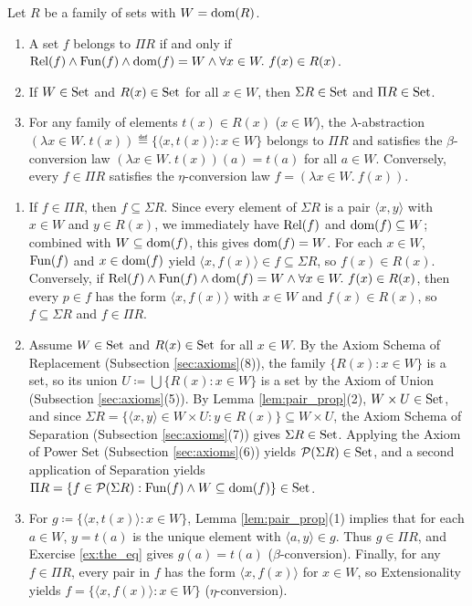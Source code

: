 \documentclass[10pt,a4paper]{article}
\begin{document}
\begin{lemma}\label{lem:sigma_pi}
Let $R$ be a family of sets with $W = {\textrm{dom}}(R)$.
\begin{enumerate}
\item A set $f$ belongs to $\Pi R$ if and only if ${\textrm{Rel}}(f) \land {\textrm{Fun}}(f) \land {\textrm{dom}}(f) = W \land \forall x \in W.\ f(x) \in R(x)$.
\item If $W \in {\textrm{Set}}$ and $R(x) \in {\textrm{Set}}$ for all $x \in W$, then $\Sigma R \in {\textrm{Set}}$ and $\Pi R \in {\textrm{Set}}$.
\item For any family of elements $t(x) \in R(x)$ ($x \in W$), the $\lambda$-abstraction $(\lambda x \in W.\ t(x)) \eqdef \{\langle x, t(x) \rangle : x \in W\}$ belongs to $\Pi R$ and satisfies the $\beta$-conversion law $(\lambda x \in W.\ t(x))(a) = t(a)$ for all $a \in W$. Conversely, every $f \in \Pi R$ satisfies the $\eta$-conversion law $f = (\lambda x \in W.\ f(x))$.
\end{enumerate}
\end{lemma}
\myprf
\begin{enumerate}
\item If $f \in \Pi R$, then $f \subseteq \Sigma R$. Since every element of $\Sigma R$ is a pair $\langle x, y \rangle$ with $x \in W$ and $y \in R(x)$, we immediately have ${\textrm{Rel}}(f)$ and ${\textrm{dom}}(f) \subseteq W$; combined with $W \subseteq {\textrm{dom}}(f)$, this gives ${\textrm{dom}}(f) = W$. For each $x \in W$, ${\textrm{Fun}}(f)$ and $x \in {\textrm{dom}}(f)$ yield $\langle x, f(x) \rangle \in f \subseteq \Sigma R$, so $f(x) \in R(x)$. Conversely, if ${\textrm{Rel}}(f) \land {\textrm{Fun}}(f) \land {\textrm{dom}}(f) = W \land \forall x \in W.\ f(x) \in R(x)$, then every $p \in f$ has the form $\langle x, f(x) \rangle$ with $x \in W$ and $f(x) \in R(x)$, so $f \subseteq \Sigma R$ and $f \in \Pi R$.
\item Assume $W \in {\textrm{Set}}$ and $R(x) \in {\textrm{Set}}$ for all $x \in W$. By the Axiom Schema of Replacement (Subsection \ref{sec:axioms}(8)), the family $\{R(x) : x \in W\}$ is a set, so its union $U \coloneqq \bigcup \{R(x) : x \in W\}$ is a set by the Axiom of Union (Subsection \ref{sec:axioms}(5)). By Lemma \ref{lem:pair_prop}(2), $W \times U \in {\textrm{Set}}$, and since $\Sigma R = \{\langle x, y \rangle \in W \times U : y \in R(x)\} \subseteq W \times U$, the Axiom Schema of Separation (Subsection \ref{sec:axioms}(7)) gives $\Sigma R \in {\textrm{Set}}$. Applying the Axiom of Power Set (Subsection \ref{sec:axioms}(6)) yields ${\mathcal{P}}(\Sigma R) \in {\textrm{Set}}$, and a second application of Separation yields $\Pi R = \{f \in {\mathcal{P}}(\Sigma R) : {\textrm{Fun}}(f) \land W \subseteq {\textrm{dom}}(f)\} \in {\textrm{Set}}$.
\item For $g \coloneqq \{\langle x, t(x) \rangle : x \in W\}$, Lemma \ref{lem:pair_prop}(1) implies that for each $a \in W$, $y = t(a)$ is the unique element with $\langle a, y \rangle \in g$. Thus $g \in \Pi R$, and Exercise \ref{ex:the_eq} gives $g(a) = t(a)$ ($\beta$-conversion). Finally, for any $f \in \Pi R$, every pair in $f$ has the form $\langle x, f(x) \rangle$ for $x \in W$, so Extensionality yields $f = \{\langle x, f(x) \rangle : x \in W\}$ ($\eta$-conversion).
\end{enumerate}
\myqed
\end{document}
